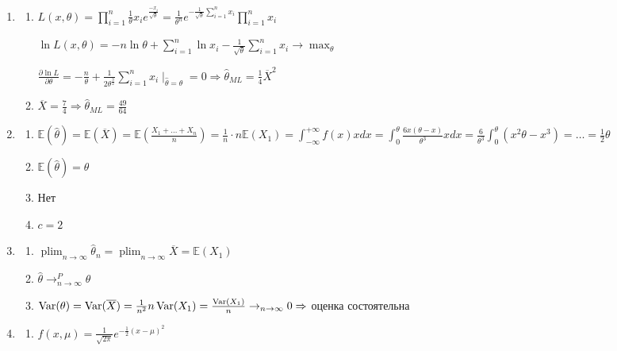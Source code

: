 \documentclass[12pt, a4paper]{article}\usepackage[]{graphicx}\usepackage[]{color}
\DeclareMathOperator*\plim{plim}
\begin{document}
\begin{enumerate}
	\item
		\begin{enumerate}
			\item $L(x, \theta) = \prod_{i=1}^{n} \frac{1}{\theta} x_i e^{\frac{-x_i}{\sqrt{\theta}}} = \frac{1}{\theta^n} e^{-\frac{1}{\sqrt{\theta}} \sum_{i=1}^n x_i} \prod_{i=1}^{n}x_i$

			$\ln L(x, \theta) = -n \ln \theta + \sum_{i=1}^n \ln x_i - \frac{1}{\sqrt{\theta}} \sum_{i=1}^n x_i \to \max_\theta $

			$\frac{\partial \ln L}{\partial \theta} = -\frac{n}{\theta} + \frac{1}{2\theta^{\frac{3}{2}}} \sum_{i=1}^{n} x_i \mid_{\hat{\theta} = \theta} =0 \Rightarrow \hat{\theta}_{ML} = \frac{1}{4} \overline{X}^2$

			\item $\overline{X} = \frac{7}{4} \Rightarrow \hat{\theta}_{ML} = \frac{49}{64}$
		\end{enumerate}

	\item
		\begin{enumerate}
			\item $\mathbb{E}(\hat{\theta}) = \mathbb{E}(\overline{X}) = \mathbb{E} \left(\frac{X_1+\ldots+X_n}{n} \right) = \frac{1}{n} \cdot n \mathbb{E}(X_1) = \int_{-\infty}^{+\infty} f(x)x dx = \int_{0}^{\theta} \frac{6x(\theta-x)}{\theta^3} x dx = \frac{6}{\theta^3} \int_{0}^{\theta} \left( x^2\theta - x^3\right) = \ldots = \frac{1}{2} \theta$
			\item $\mathbb{E}(\hat{\theta}) = \theta$
			\item Нет
			\item $c=2$
		\end{enumerate}

	\item
		\begin{enumerate}
			\item $\plim_{n\to\infty} \hat{\theta}_n = \plim_{n\to\infty} \overline{X} = \mathbb{E}(X_1)$
			\item $\hat{\theta} \to^P_{n\to\infty} \theta$
			\item $\operatorname{Var}(\theta) = \operatorname{Var}(\overline{X}) = \frac{1}{n^2}n\operatorname{Var}(X_1) = \frac{\operatorname{Var}(X_1)}{n} \to_{n\to\infty} 0 \Rightarrow$ оценка состоятельна
		\end{enumerate}

	\item
		\begin{enumerate}
			\item $f(x, \mu) =  \frac{1}{\sqrt{2 \pi}} e^{-\frac{1}{2} (x - \mu)^2}$


\end{enumerate}
\end{enumerate}
\end{document}
